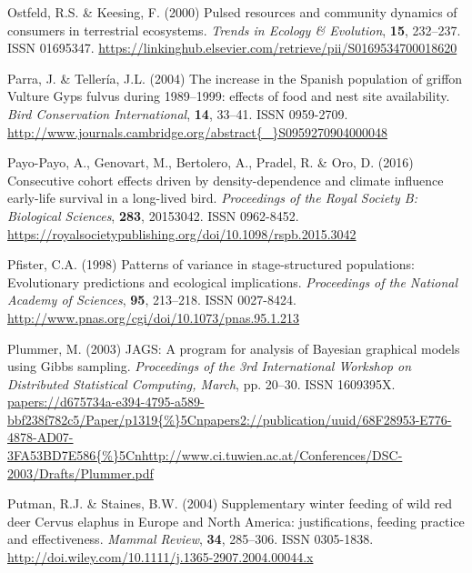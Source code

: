 \documentclass[12pt]{article}
\begin{document}
\begin{thebibliography}{87}
	Ostfeld, R.S. \& Keesing, F. (2000) {Pulsed resources and community dynamics of
		consumers in terrestrial ecosystems}.
	\newblock \emph{Trends in Ecology {\&} Evolution}, \textbf{15}, 232--237.
	\newblock ISSN 01695347.
	\newline\urlprefix\url{https://linkinghub.elsevier.com/retrieve/pii/S0169534700018620}
	
	Parra, J. \& Teller{\'{i}}a, J.L. (2004) {The increase in the Spanish
		population of griffon Vulture Gyps fulvus during 1989–1999: effects of food
		and nest site availability}.
	\newblock \emph{Bird Conservation International}, \textbf{14}, 33--41.
	\newblock ISSN 0959-2709.
	\newline\urlprefix\url{http://www.journals.cambridge.org/abstract{\_}S0959270904000048}
	
	Payo-Payo, A., Genovart, M., Bertolero, A., Pradel, R. \& Oro, D. (2016)
	{Consecutive cohort effects driven by density-dependence and climate
		influence early-life survival in a long-lived bird}.
	\newblock \emph{Proceedings of the Royal Society B: Biological Sciences},
	\textbf{283}, 20153042.
	\newblock ISSN 0962-8452.
	\newline\urlprefix\url{https://royalsocietypublishing.org/doi/10.1098/rspb.2015.3042}
	
	Pfister, C.A. (1998) {Patterns of variance in stage-structured populations:
		Evolutionary predictions and ecological implications}.
	\newblock \emph{Proceedings of the National Academy of Sciences}, \textbf{95},
	213--218.
	\newblock ISSN 0027-8424.
	\newline\urlprefix\url{http://www.pnas.org/cgi/doi/10.1073/pnas.95.1.213}
	
	Plummer, M. (2003) {JAGS: A program for analysis of Bayesian graphical models
		using Gibbs sampling}.
	\newblock  \emph{Proceedings of the 3rd International Workshop on Distributed
		Statistical Computing, March}, pp. 20--30.
	\newblock ISSN 1609395X.
	\newline\urlprefix\url{papers://d675734a-e394-4795-a589-bbf238f782c5/Paper/p1319{\%}5Cnpapers2://publication/uuid/68F28953-E776-4878-AD07-3FA53BD7E586{\%}5Cnhttp://www.ci.tuwien.ac.at/Conferences/DSC-2003/Drafts/Plummer.pdf}
	
	Putman, R.J. \& Staines, B.W. (2004) {Supplementary winter feeding of wild red
		deer Cervus elaphus in Europe and North America: justifications, feeding
		practice and effectiveness}.
	\newblock \emph{Mammal Review}, \textbf{34}, 285--306.
	\newblock ISSN 0305-1838.
	\newline\urlprefix\url{http://doi.wiley.com/10.1111/j.1365-2907.2004.00044.x}
	

\end{thebibliography}
\end{document}
